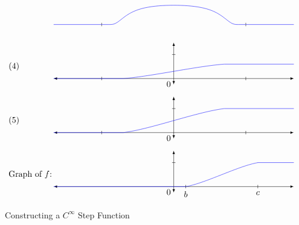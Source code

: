 \documentclass[../../main]{subfiles}
\begin{document}
\begin{figure}[p!]
\[\begin{tikzpicture}
\begin{scope}[shift={(0,-6.75)}]
    \draw (-3,2pt)--(-3,-2pt);
    \draw (3,2pt)--(3,-2pt);
    
    \draw[blue] (-5,0)--(-3,0);
    \draw[blue, domain=-2.99:2.99, samples=100]
    plot (\x, {exp(-1/pow(3+\x,2))*exp(-1/pow(3-\x,2)) } );
    \draw[blue] (3,0)--(5,0);
    \end{scope}
    
    \begin{scope}[shift={(0,-9)}]
    \draw (-7,0.5) node[anchor=west] {(4)};
    \draw[latex-latex]
        (-5,0)--
        (0,0) node[anchor=north east] {$0$} --
        (5,0);
    \draw[latex-latex] (0,-0.25)--(0,1.5) ;
    \draw (2pt,1)--(-2pt,1) node[anchor=east] {};
    
    \draw (-3,2pt)--(-3,-2pt);
    \draw (3,2pt)--(3,-2pt);
    
    \draw[blue, domain=-2.1047:2.1047, samples=100]
    plot (\x, {
        0.6*0.35014*( 
  1.428 
+ \x/pow(e, 2/9) 
- (2*pow(\x,3))/(81*pow(e, 2/9)) 
- (8*pow(\x,5))/(3645*pow(e, 2/9)) 
    });
    \draw[blue] (-5,0)--(-2.1047,0);
    \draw[blue] (2.1047,0.6)--(5,0.6);
    \end{scope}
    
    \begin{scope}[shift={(0,-11.25)}]
    \draw (-7,0.5) node[anchor=west] {(5)};
    \draw[latex-latex]
        (-5,0)--
        (0,0) node[anchor=north east] {$0$} --
        (5,0);
    \draw[latex-latex] (0,-0.25)--(0,1.5) ;
    \draw (2pt,1)--(-2pt,1) node[anchor=east] {};
    
    \draw (-3,2pt)--(-3,-2pt);
    \draw (3,2pt)--(3,-2pt);
    
    \draw[blue, domain=-2.1047:2.1047, samples=100]
    plot (\x, {
        0.35014*( 
  1.428 
+ \x/pow(e, 2/9) 
- (2*pow(\x,3))/(81*pow(e, 2/9)) 
- (8*pow(\x,5))/(3645*pow(e, 2/9)) 
    });
    \draw[blue] (-5,0)--(-2.1047,0);
    \draw[blue] (2.1047,1)--(5,1);
    \end{scope}
    
    \begin{scope}[shift={(0,-13.5)}]
    \draw (-7,0.5) node[anchor=west] {Graph of $f$:};
    \draw[latex-latex]
        (-5,0)--
        (0,0) node[anchor=north east] {$0$} --
        (5,0);
    \draw[latex-latex] (0,-0.25)--(0,1.5) ;
    \draw (2pt,1)--(-2pt,1) node[anchor=east] {};
    
    \draw (0.5,2pt)--(0.5,-2pt) node[anchor=north] {$b$};
    \draw (3.5,2pt)--(3.5,-2pt) node[anchor=north] {$c$};
    
    \draw[blue, domain=-2.1047:2.1047, samples=100]
    plot ({0.5+(2.1047+\x)/1.4}, {
        0.35014*( 
  1.428 
+ \x/pow(e, 2/9) 
- (2*pow(\x,3))/(81*pow(e, 2/9)) 
- (8*pow(\x,5))/(3645*pow(e, 2/9)) 
    });
    \draw[blue] (-5,0)--(0.5,0);
    \draw[blue] (3.5,1)--(5,1);
    \end{scope}
\end{tikzpicture}
\]
\caption{Constructing a $C^\infty$ Step Function}
\label{fig:ch06fig1}
\end{figure}
\end{document}

